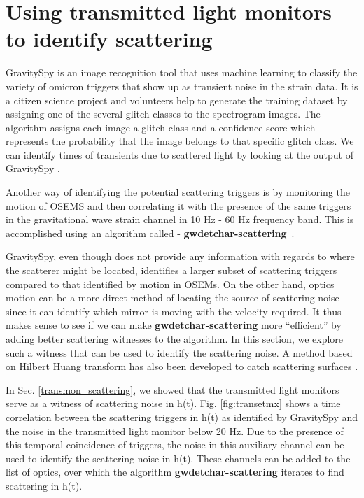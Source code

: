 \documentclass[12pt]{iopart}
\begin{document}
\par 

\vspace{0.5cm}
 
\section{Using transmitted light monitors to identify scattering}\label{transmonwitness}
GravitySpy is an image recognition tool that uses machine learning to classify the variety of omicron triggers that show up as transient noise in the strain data.  It is a citizen science project and volunteers help to generate the training dataset by assigning one of the several glitch classes to the spectrogram images. The algorithm assigns each image a glitch class and a confidence score which represents the probability that the image belongs to that specific glitch class.
We can identify times of transients due to scattered light by looking at the output of GravitySpy \cite{Zevin_2017,gspymachine}.

Another way of identifying the potential scattering triggers is by monitoring the motion of OSEMS and then correlating it with the presence of the same triggers in the gravitational wave strain channel in 10 Hz - 60 Hz frequency band. This is accomplished using an algorithm called - \textbf{gwdetchar-scattering}~\cite{alex_l_urban_2019_3526829}. 



GravitySpy, even though does not provide any information with regards to where the scatterer might be located, identifies a larger subset of scattering triggers compared to that identified by motion in OSEMs. On the other hand, optics motion can be a more direct method of locating the source of scattering noise since it can identify which mirror is moving with the velocity required. It thus makes sense to see if we can make \textbf{gwdetchar-scattering} more ``efficient'' by adding better scattering witnesses to the algorithm. In this section, we explore such a witness that can be used to identify the scattering noise. A method based on Hilbert Huang transform has also been developed to catch scattering surfaces \cite{Valdes_2017}.

In Sec. \ref{transmon_scattering}, we showed that the transmitted light monitors serve as a witness of scattering noise in h(t). Fig. \ref{fig:transetmx} shows a time correlation between the scattering triggers in h(t) as identified by GravitySpy and the noise in the transmitted light monitor below 20 Hz. Due to the presence of this temporal coincidence of triggers, the noise in this auxiliary channel can be used to identify the scattering noise in h(t). 
These channels can be added to the list of optics, over which the algorithm \textbf{gwdetchar-scattering} iterates to find scattering in h(t).
\end{document}
